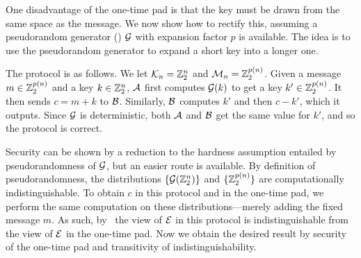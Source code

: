 \begin{ex}\label{ex:botp}
  One disadvantage of the one-time pad is that the key must be drawn from the
  same space as the message. We now show how to rectify this, assuming a
  pseudorandom generator
  ()
  $\mathcal{G}$ with expansion factor $p$ is available.
  The idea is to use the pseudorandom generator to expand a short
    key into a longer one.

  The protocol is as follows. We let $\mathcal{K}_n = \mathbb{Z}_2^n$ and $\mathcal{M}_n =
  \mathbb{Z}_2^{p(n)}$. Given a message $m\in\mathbb{Z}_2^{p(n)}$ and a key $k\in\mathbb{Z}_2^n$,
  $\mathcal{A}$ first computes $\mathcal{G}(k)$ to get a key $k'\in\mathbb{Z}_2^{p(n)}$. It then sends
  $c = m + k$ to $\mathcal{B}$. Similarly, $\mathcal{B}$ computes $k'$ and then $c - k'$, which
  it outputs. Since $\mathcal{G}$ is deterministic, both $\mathcal{A}$ and $\mathcal{B}$ get the same
  value for $k'$, and so the protocol is correct.

  Security can be shown by a reduction to the hardness assumption entailed by
  pseudorandomness of $\mathcal{G}$, but an easier route is available. By definition of
  pseudorandomness, the distributions $\{\mathcal{G}(\mathbb{Z}_2^n)\}$ and $\{\mathbb{Z}_2^{p(n)}\}$
  are computationally indistinguishable. To obtain $c$ in this protocol and in
  the one-time pad, we perform the same computation on these
  distributions---merely adding the fixed message $m$. As such,
  by~ the view of $\mathcal{E}$ in this
  protocol is indistinguishable from the view of $\mathcal{E}$ in the one-time pad. Now
  we obtain the desired result by security of the one-time pad and transitivity
  of indistinguishability.
\end{ex}







